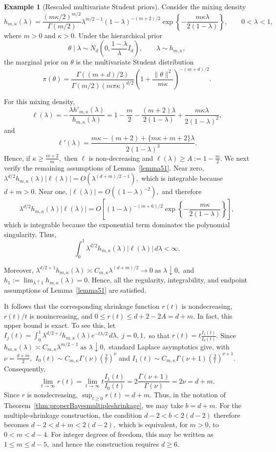 \documentclass[11pt]{article}
\theoremstyle{definition}
\newtheorem{example}{Example}
\begin{document}
\begin{example}[Rescaled multivariate Student priors]
Consider the mixing density
\[
h_{m,\kappa}(\lambda)
=
\frac{(m\kappa/2)^{m/2}}{\Gamma(m/2)}
\lambda^{m/2-1}(1-\lambda)^{-(m+2)/2}
\exp\left\{
-\frac{m\kappa\lambda}{2(1-\lambda)}
\right\},
\qquad 0<\lambda<1,
\]
where $m>0$ and $\kappa>0$. Under the hierarchical prior
\[
\theta\mid\lambda
\sim
N_d\left(0,\frac{1-\lambda}{\lambda}I_d\right),
\qquad
\lambda\sim h_{m,\kappa},
\]
the marginal prior on $\theta$ is the multivariate Student distribution
\[
\pi(\theta)
=
\frac{\Gamma((m+d)/2)}
{\Gamma(m/2)(m\pi\kappa)^{d/2}}
\left(
1+\frac{\|\theta\|^2}{m\kappa}
\right)^{-(m+d)/2}.
\]

For this mixing density,
\[
\ell(\lambda)
=
-\frac{\lambda h'_{m,\kappa}(\lambda)}
{h_{m,\kappa}(\lambda)}
=
1-\frac{m}{2}
-\frac{(m+2)\lambda}{2(1-\lambda)}
+\frac{m\kappa\lambda}{2(1-\lambda)^2},
\]
and
\[
\ell'(\lambda)
=
\frac{
m\kappa-(m+2)
+
\{m\kappa+m+2\}\lambda
}
{2(1-\lambda)^3}.
\]
Hence, if $\kappa\geq\frac{m+2}{m},$ then $\ell$ is non-decreasing and $\ell(\lambda)\geq A :=1-\frac{m}{2}.$ We next verify the remaining assumptions of
Lemma~\ref{lemma51}. Near zero, $\lambda^{d/2}h_{m,\kappa}(\lambda)|\ell(\lambda)|
=
O\left(
\lambda^{(d+m)/2-1}
\right),$ which is integrable because $d+m>0$. Near one, $|\ell(\lambda)|
=
O\left((1-\lambda)^{-2}\right),$ and therefore
\[
\lambda^{d/2}h_{m,\kappa}(\lambda)|\ell(\lambda)|
=
O\left[
(1-\lambda)^{-(m+6)/2}
\exp\left\{
-\frac{m\kappa}{2(1-\lambda)}
\right\}
\right],
\]
which is integrable because the exponential term dominates the
polynomial singularity. Thus,
\[
\int_0^1
\lambda^{d/2}
h_{m,\kappa}(\lambda)
|\ell(\lambda)|
\,d\lambda
<\infty.
\]

Moreover, $\lambda^{d/2+1}h_{m,\kappa}(\lambda)
\asymp
C_{m,\kappa}
\lambda^{(d+m)/2}
\longrightarrow0
\; \text{as }\lambda\downarrow0,$ and $h_1
:=
\lim_{\lambda\uparrow1}h_{m,\kappa}(\lambda)
=
0.$
Hence, all the regularity, integrability, and endpoint assumptions of Lemma~\ref{lemma51} are satisfied.

It follows that the corresponding shrinkage function $r(t)$ is
nondecreasing, $r(t)/t$ is nonincreasing, and $0\leq r(t)\leq d+2-2A=d+m.$ In fact, this upper bound is exact. To see this, let $I_j(t)
=
\int_0^1
\lambda^{d/2+j}
h_{m,\kappa}(\lambda)
e^{-t\lambda/2}
\,d\lambda,
\;  j=0,1,$ 
so that $r(t)=t\frac{I_1(t)}{I_0(t)}.$ Since $h_{m,\kappa}(\lambda)
\asymp
C_{m,\kappa}\lambda^{m/2-1}
\; \text{as }\lambda\downarrow0,$
standard Laplace asymptotics give, with $\nu=\frac{d+m}{2},$ $I_0(t)
\sim
C_{m,\kappa}\Gamma(\nu)
\left(\frac{2}{t}\right)^\nu$
and $I_1(t)
\sim
C_{m,\kappa}\Gamma(\nu+1)
\left(\frac{2}{t}\right)^{\nu+1}.$
Consequently,
\[
\lim_{t\to\infty}r(t)
=
\lim_{t\to\infty}
t\frac{I_1(t)}{I_0(t)}
=
2\frac{\Gamma(\nu+1)}{\Gamma(\nu)}
=
2\nu
=
d+m.
\]
Since $r$ is nondecreasing, $\sup_{t\geq0}r(t)=d+m.$ Thus, in the notation of Theorem~\ref{thm:properBayesmultipleshrinkage},
we may take $b=d+m.$ For the multiple-shrinkage construction, the condition $d-2<b<2(d-2)$ therefore becomes $d-2<d+m<2(d-2),$ which is equivalent, for $m>0$, to $0<m<d-4.$ For integer degrees of freedom, this may be written as $1\leq m\leq d-5,$ and hence the construction requires $d\geq6$.


\end{example}
\end{document}
